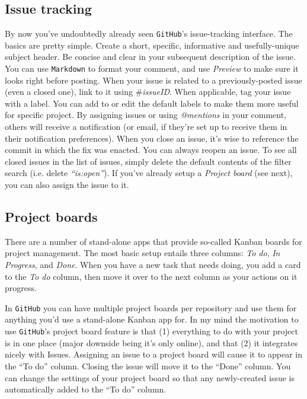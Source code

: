 \documentclass[12pt,letterpaper]{article}
\begin{document}
\subsection{Issue tracking}
By now you've undoubtedly already seen \texttt{GitHub}'s issue-tracking 
interface.
The basics are pretty simple.
Create a short, specific, informative and usefully-unique subject header.
Be concise and clear in your subsequent description of the issue.
You can use \texttt{Markdown} to format your comment, and use \emph{Preview} to make sure it looks right before posting.
When your issue is related to a previously-posted issue (even a closed one), link to it using \emph{$\#$issueID}.
When applicable, tag your issue with a label.
You can add to or edit the default labels to make them more useful for specific project.
By assigning issues or using \emph{@mentions} in your comment, others will 
receive a notification
(or email, if they're set up to receive them in their notification preferences).
When you close an issue, it's wise to reference the commit in which the fix was enacted.
You can always reopen an issue.
To see all closed issues in the list of issues, 
simply delete the default contents of the filter search
(i.e. delete \emph{``is:open''}).
If you've already setup a \emph{Project board} (see next), 
you can also assign the issue to it.


\subsection{Project boards}
There are a number of stand-alone apps that provide so-called Kanban boards for project management.
The most basic setup entails three columns:
\emph{To do}, \emph{In Progress}, and \emph{Done}.
When you have a new task that needs doing, you add a card to the
\emph{To do} column, 
then move it over to the next column as your actions on it progress.

In \texttt{GitHub} you can have multiple project boards per repository and use 
them for anything you'd use a stand-alone Kanban app for.
In my mind the motivation to use \texttt{GitHub}'s project board feature is that
(1) everything to do with your project is in one place
(major downside being it's only online), and that
(2) it integrates nicely with Issues.
Assigning an issue to a project board will cause it to appear in the ``To do'' column.
Closing the issue will move it to the ``Done'' column.
You can change the settings of your project board so that any newly-created 
issue is automatically added to the ``To do'' column.
\end{document}
